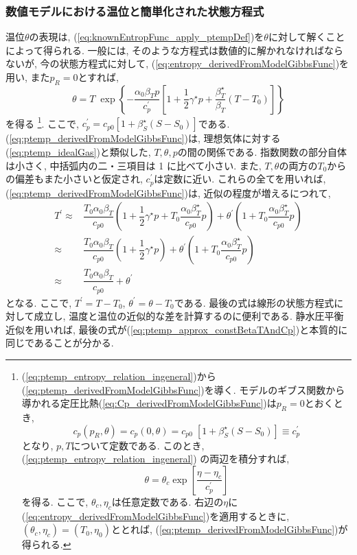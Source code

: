 \subsubsection*{数値モデルにおける温位と簡単化された状態方程式}
温位$ \theta $の表現は, (\ref{eq:knownEntropFunc_apply_ptempDef})を$ \theta $に対して解くことによって得られる. 
一般には, そのような方程式は数値的に解かれなければならないが, 
今の状態方程式に対して, (\ref{eq:entropy_derivedFromModelGibbsFunc})を用い, また$p_R=0$とすれば, 
\begin{equation}
 \theta = T \; \exp{ \left\{ - \dfrac{\alpha_0 \beta_T p}{c_p^\prime}
              \left[1 + \dfrac{1}{2}\gamma^\star p + \dfrac{\beta_T^\star}{\beta_T} (T-T_0) \right] 
          \right\} }
 \label{eq:ptemp_derivedFromModelGibbsFunc}          
\end{equation}
を得る%
\footnote{
(\ref{eq:ptemp_entropy_relation_ingeneral})から(\ref{eq:ptemp_derivedFromModelGibbsFunc})を導く. 
モデルのギブス関数から導かれる定圧比熱(\ref{eq:Cp_derivedFromModelGibbsFunc})は$p_R=0$とおくとき, 
$$
c_p(p_R, \theta) = c_p(0, \theta) =　c_{p0}\;[1+\beta^\star_S(S-S_0)] 
                 \equiv c_p^\prime
$$
となり, $p,T$について定数である. 
このとき, (\ref{eq:ptemp_entropy_relation_ingeneral}) の両辺を積分すれば, 
$$
 \theta = \theta_c \exp{\left[ \dfrac{\eta - \eta_c}{c_p^\prime}\right]}
$$
を得る. 
ここで, $\theta_c, \eta_c$は任意定数である. 
右辺の$\eta$に(\ref{eq:entropy_derivedFromModelGibbsFunc})を適用するときに, 
$(\theta_c, \eta_c)=(T_0, \eta_0)$ととれば, (\ref{eq:ptemp_derivedFromModelGibbsFunc})が得られる. 
}. 
ここで, $c_p^\prime = c_{p0} [1+\beta^\star_S(S-S_0)]$である. 
(\ref{eq:ptemp_derivedFromModelGibbsFunc})は, 理想気体に対する(\ref{eq:ptemp_idealGas})と類似した, 
$T,\theta,p$の間の関係である. 
指数関数の部分自体は小さく, 中括弧内の二・三項目は 1 に比べて小さい. 
また, $T,\theta$の両方の$T_0$からの偏差もまた小さいと仮定され, $c_p^\prime$は定数に近い. 
これらの全てを用いれば, (\ref{eq:ptemp_derivedFromModelGibbsFunc})は, 近似の程度が増えるにつれて, 
\begin{equation}
\begin{split}
  T^\prime 
  \approx & \dfrac{T_0 \alpha_0 \beta_T}{c_{p0}} \left(1 + \dfrac{1}{2}\gamma^\star p + T_0\dfrac{\alpha_0 \beta_T^\star}{c_{p0}}p \right)
               + \theta^\prime \left(1 + T_0\dfrac{\alpha_0 \beta_T^\star}{c_{p0}}p \right) \\
  \approx& \dfrac{T_0 \alpha_0 \beta_T}{c_{p0}} \left(1 + \dfrac{1}{2}\gamma^\star p \right)
                 + \theta^\prime \left(1 + T_0\dfrac{\alpha_0 \beta_T^\star}{c_{p0}}p \right) \\
  \approx& \dfrac{T_0 \alpha_0 \beta_T}{c_{p0}}  + \theta^\prime 
\end{split}
\label{eq:ptemp_temp_diff_derivedFromModelGibbsFunc}
\end{equation}
となる. ここで, $T^\prime = T-T_0$, $\theta^\prime = \theta - T_0$である. 
最後の式は線形の状態方程式に対して成立し, 
温度と温位の近似的な差を計算するのに便利である. 
静水圧平衡近似を用いれば, 最後の式が(\ref{eq:ptemp_approx_constBetaTAndCp})と本質的に同じであることが分かる. 

